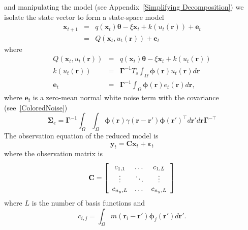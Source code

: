 \documentclass[twocolumn,11pt,a4paper]{article}		%
\begin{document}
and manipulating the model (see Appendix~\ref{Simplifying Decomposition}) we isolate the state vector to form a state-space model 
\begin{eqnarray}
	\label{Homogeneous SS Model} \mathbf{x}_{t+1} &=& q(\mathbf{x}_t)\boldsymbol{\theta} - \xi\mathbf{x}_t + k\left(u_t\left(\mathbf{r}\right)\right) + \mathbf{e}_t \\
	&=& Q\left(\mathbf{x}_t,u_t(\mathbf{r})\right) + \mathbf{e}_t 
\end{eqnarray}
where
\begin{eqnarray}
Q\left(\mathbf{x}_t,u_t(\mathbf{r})\right)&=& q(\mathbf{x}_t)\boldsymbol{\theta} - \xi\mathbf{x}_t + k\left(u_t\left(\mathbf{r}\right)\right)\label{eq:QmatrixForSigmapoints}\\
	k(u_t(\mathbf{r})) &=& \boldsymbol{\Gamma}^{-1}T_s \int_\Omega{\boldsymbol{\phi} \left(\mathbf{r}\right) u_t\left(\mathbf{r}\right)d\mathbf{r}} \\
	\mathbf{e}_t &=& \label{eq:Reducednoiseterm} \boldsymbol{\Gamma}^{-1}\int_\Omega{\boldsymbol{\phi}(\mathbf{r})e_t(\mathbf{r})d\mathbf{r}}, 
\end{eqnarray}
where $\mathbf{e}_t$ is a zero-mean normal white noise term with the covariance (see~\ref{ColoredNoise}) 
\begin{equation}
	\boldsymbol{\Sigma}_e=\boldsymbol{\Gamma}^{-1}\int_{\Omega}\int_{\Omega}\boldsymbol{\phi}\left(\mathbf r\right) \gamma\left(\mathbf{r}- \mathbf{r}' \right)\boldsymbol{\phi}\left(\mathbf{r}'\right)^{\top}d\mathbf{r}' d\mathbf{r}\boldsymbol{\Gamma}^{- \top} 
\end{equation}
The observation equation of the reduced model is 
\begin{equation}
	\label{ObservationEquation} \mathbf{y}_t = \mathbf{C}\mathbf{x}_t + \boldsymbol{\varepsilon}_t 
\end{equation}
where the observation matrix is 
\begin{equation}
	\mathbf{C} = \left[
	\begin{array}{{ccc}} 
		c_{1,1} & \dots & c_{1,L} \\
		\vdots & \ddots & \vdots \\
		c_{n_y,L} & \dots & c_{n_y,L} 
	\end{array}
	\right] 
\end{equation}
where $L$ is the number of basis functions and 
\begin{equation}
	c_{i,j} = \int_{\Omega}m(\mathbf{r}_i - \mathbf{r}')\boldsymbol{\phi}_j(\mathbf{r}')d\mathbf{r}'. 
\end{equation}
\end{document}
